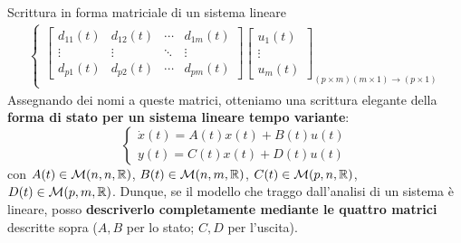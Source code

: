 \documentclass[a4paper]{report}
\begin{document}
\begin{defin}{Scrittura in forma matriciale di un sistema lineare}{}
\begin{align}
\begin{cases}
{\begin{bmatrix}
			d_{11}(t) & d_{12}(t) & \cdots &d_{1m}(t) \\
			\vdots & \vdots & \ddots & \vdots \\
			d_{p1}(t) & d_{p2}(t) & \cdots &d_{pm}(t)
		\end{bmatrix} \begin{bmatrix}
			u_1(t) \\ \vdots \\ u_m(t)
		\end{bmatrix}}_{(p \times m)(m\times 1) \rightarrow (p\times 1)}
		\end{cases}
\end{align}
	Assegnando dei nomi a queste matrici, otteniamo una scrittura elegante della \textbf{forma di stato per un sistema lineare tempo variante}:
	\begin{equation}
		\begin{cases}
			\dot x(t) = A(t)x(t) + B(t)u(t) \\
			y(t) = C(t)x(t) + D(t)u(t)
		\end{cases}
	\end{equation}
	con $A(t) \in \mathcal{M}(n,n,\mathbb{R})$, $B(t) \in \mathcal{M}(n,m,\mathbb{R})$, $C(t) \in \mathcal{M}(p,n,\mathbb{R})$, $D(t) \in \mathcal{M}(p,m,\mathbb{R})$.
Dunque, se il modello che traggo dall'analisi di un sistema è lineare, posso \textbf{descriverlo completamente mediante le quattro matrici} descritte sopra ($A,B$ per lo stato; $C,D$ per l'uscita).
\end{defin}
\end{document}
